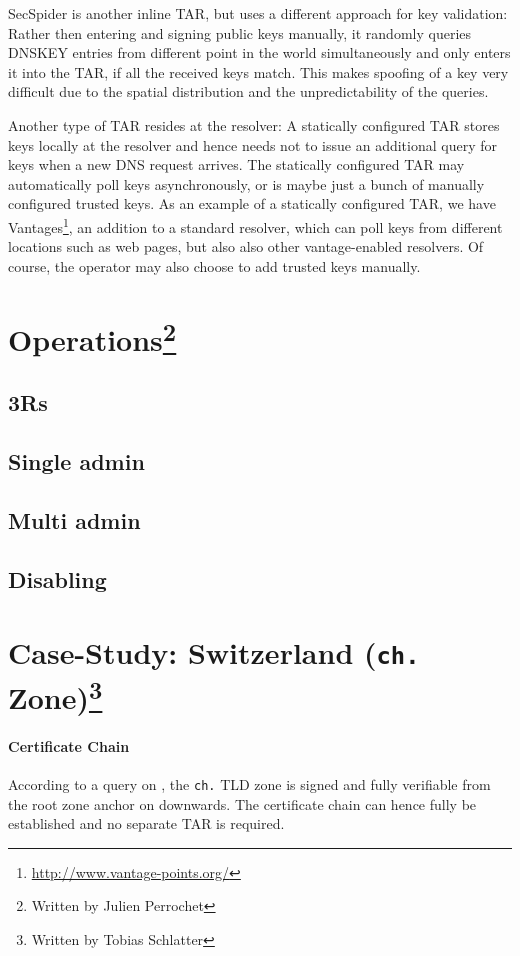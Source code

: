 \documentclass[a4paper,twocolumn]{scrartcl}
\newcommand{\wbjp}{\protect\footnote{Written by Julien Perrochet}}
\newcommand{\wbts}{\protect\footnote{Written by Tobias Schlatter}}
\begin{document}
SecSpider \cite{secspider, Osterweil09} is another inline TAR, but
uses a different approach for key validation: Rather then entering and
signing public keys manually, it randomly queries DNSKEY entries from
different point in the world simultaneously and only enters it into
the TAR, if all the received keys match. This makes spoofing of a key
very difficult due to the spatial distribution and the
unpredictability of the queries.

Another type of TAR resides at the resolver: A statically configured
TAR stores keys locally at the resolver and hence needs not to issue an
additional query for keys when a new DNS request arrives. The
statically configured TAR may automatically poll keys asynchronously,
or is maybe just a bunch of manually configured trusted keys. As an
example of a statically configured TAR, we have
Vantages\footnote{\url{http://www.vantage-points.org/}}, an addition
to a standard resolver, \cite{Osterweil09} which can poll keys from
different locations such as web pages, but also also other
vantage-enabled resolvers. Of course, the operator may also choose to
add trusted keys manually.

\section{Operations\wbjp}
\subsection{3Rs}
\subsection{Single admin}
\subsection{Multi admin}
\subsection{Disabling}

\section{Case-Study: Switzerland (\texttt{ch.} Zone)\wbts}
\label{sec:case-study}

\paragraph{Certificate Chain} According to a query on
\cite{secspider}, the \verb|ch.| TLD zone is signed and fully
verifiable from the root zone anchor on downwards. The certificate
chain can hence fully be established and no separate TAR is required.
\end{document}
